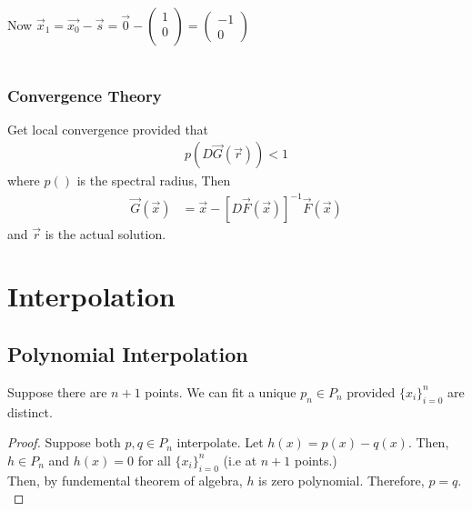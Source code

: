 \documentclass[11pt,oneside]{book}
\theoremstyle{break}
\theoremstyle{break}
\begin{document}
Now $\vec{x}_1=\vec{x_0}-\vec{s}=\vec{0}-\begin{pmatrix}
1\\
0\\
\end{pmatrix}=\begin{pmatrix}
-1\\
0
\end{pmatrix}$\\
\hfill\\
\subsection[Convergence Theory]{Convergence Theory}
Get local convergence provided that \begin{align*}
p(D\vec{G}(\vec{r}))<1
\end{align*}
where $p()$ is the spectral radius, Then \begin{align*}
\vec{G}(\vec{x})&=\vec{x}-[D\vec{F}(\vec{x})]^{-1}\vec{F}(\vec{x})
\end{align*}
and $\vec{r}$ is the actual solution.
\chapter[Interpolation]{Interpolation}
\section[Polynomial Interpolation]{Polynomial Interpolation}
Suppose there are $n+1$ points. We can fit a unique $p_n\in P_n$ provided $\{x_i\}^n_{i=0}$ are distinct.
\begin{proof}
Suppose both $p,q\in P_n$ interpolate. Let $h(x)=p(x)-q(x).$ Then, $h\in P_n$ and $h(x)=0$ for all $\{x_i\}^n_{i=0}$ (i.e at $n+1$ points.)\\
Then, by fundemental theorem of algebra, $h$ is zero polynomial. Therefore, $p=q.$
\end{proof}
\end{document}
